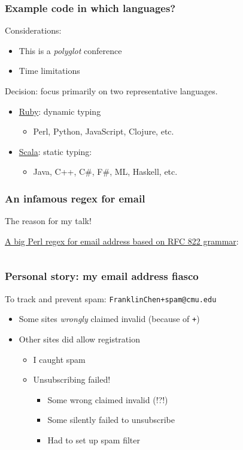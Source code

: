 \begin{frame}
  \frametitle{Example code in which languages?}

  Considerations:
  \begin{itemize}
    \item This is a \emph{polyglot} conference
    \item Time limitations
  \end{itemize}

  Decision: focus primarily on two representative languages.
  \begin{itemize}
    \item \href{http://www.ruby-lang.org/}{Ruby}: dynamic typing
      \begin{itemize}
        \item Perl, Python, JavaScript, Clojure, etc.
      \end{itemize}
    \item \href{http://www.scala-lang.org/}{Scala}: static typing: 
      \begin{itemize}
        \item Java, C++, C\#, F\#, ML, Haskell, etc.
      \end{itemize}
  \end{itemize}
\end{frame}

\begin{frame}[fragile]
  \frametitle{An infamous regex for email}

  The reason for my talk!

  \href{http://www.ex-parrot.com/pdw/Mail-RFC822-Address.html}{A big Perl regex for email address based on RFC 822 grammar}:

  \inputminted{text}{extra/rfc-822.pl}
\end{frame}

\begin{frame}
  \frametitle{Personal story: my email address fiasco}

  To track and prevent spam: \texttt{FranklinChen+spam@cmu.edu}

  \begin{itemize}
    \item Some sites \emph{wrongly} claimed invalid (because of \texttt{+})
    \item Other sites did allow registration
      \begin{itemize}
        \item I caught spam
        \item Unsubscribing failed!
          \begin{itemize}
            \item Some wrong claimed invalid (!?!)
            \item Some silently failed to unsubscribe
            \item Had to set up spam filter
          \end{itemize}
      \end{itemize}
  \end{itemize}
\end{frame}

